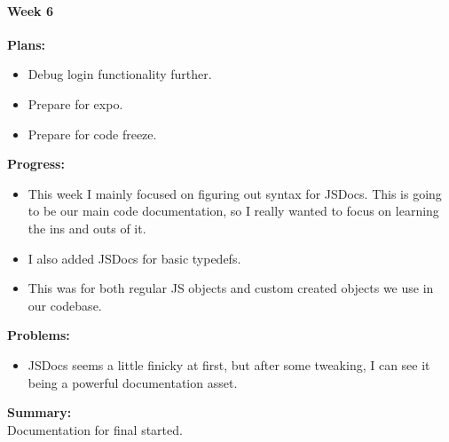 \paragraph{Week 6}
\begin{adjustwidth}{2.5em}{0pt}
    \vspace{-0.5cm}\textbf{Plans:}
    \vspace{-0.5cm}
    \begin{itemize}
        \item Debug login functionality further. 
		\item Prepare for expo.
        \item Prepare for code freeze.
    \end{itemize} 
    \vspace{-0.3cm}\textbf{Progress:}
    \vspace{-0.5cm}
    \begin{itemize}
        \item This week I mainly focused on figuring out syntax for JSDocs. This is going to be our main code documentation, so I really wanted to focus on learning the ins and outs of it. 
		\item I also added JSDocs for basic typedefs. 
		\item This was for both regular JS objects and custom created objects we use in our codebase. 
    \end{itemize} 
    \vspace{-0.3cm}\textbf{Problems:}
    \vspace{-0.5cm}
    \begin{itemize}
        \item JSDocs seems a little finicky at first, but after some tweaking, I can see it being a powerful documentation asset.
    \end{itemize}  
    \vspace{-0.3cm}\noindent\textbf{Summary:}\\
    \noindent Documentation for final started. 
\end{adjustwidth} 
